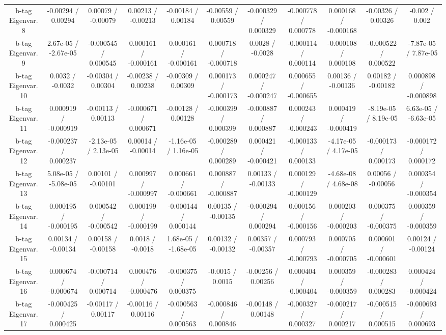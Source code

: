 \begin{table}[htbp]
\begin{center}
\begin{tabular}{|c|c|c|c|c|c|c|c|c|c|c|}
  b-tag Eigenvar. 8 & -0.00294 / 0.00294 & 0.00079 / -0.00079 & 0.00213 / -0.00213 & -0.00184 / 0.00184 & -0.00559 / 0.00559 & -0.000329 / 0.000329 & -0.000778 / 0.000778 & 0.000168 / -0.000168 & -0.00326 / 0.00326 & -0.002 / 0.002 \\ 
  b-tag Eigenvar. 9 & 2.67e-05 / -2.67e-05 & -0.000545 / 0.000545 & 0.000161 / -0.000161 & 0.000161 / -0.000161 & 0.000718 / -0.000718 & 0.0028 / -0.0028 & -0.000114 / 0.000114 & -0.000108 / 0.000108 & -0.000522 / 0.000522 & -7.87e-05 / 7.87e-05 \\ 
  b-tag Eigenvar. 10 & 0.0032 / -0.0032 & -0.00304 / 0.00304 & -0.00238 / 0.00238 & -0.00309 / 0.00309 & 0.000173 / -0.000173 & 0.000247 / -0.000247 & 0.000655 / -0.000655 & 0.00136 / -0.00136 & 0.00182 / -0.00182 & 0.000898 / -0.000898 \\ 
  b-tag Eigenvar. 11 & 0.000919 / -0.000919 & -0.00113 / 0.00113 & -0.000671 / 0.000671 & -0.00128 / 0.00128 & -0.000399 / 0.000399 & -0.000887 / 0.000887 & 0.000243 / -0.000243 & 0.000419 / -0.000419 & -8.19e-05 / 8.19e-05 & 6.63e-05 / -6.63e-05 \\ 
  b-tag Eigenvar. 12 & -0.000237 / 0.000237 & -2.13e-05 / 2.13e-05 & 0.00014 / -0.00014 & -1.16e-05 / 1.16e-05 & -0.000289 / 0.000289 & 0.000421 / -0.000421 & -0.000133 / 0.000133 & -4.17e-05 / 4.17e-05 & -0.000173 / 0.000173 & -0.000172 / 0.000172 \\ 
  b-tag Eigenvar. 13 & 5.08e-05 / -5.08e-05 & 0.00101 / -0.00101 & 0.000997 / -0.000997 & 0.000661 / -0.000661 & 0.000887 / -0.000887 & 0.00133 / -0.00133 & 0.000129 / -0.000129 & -4.68e-08 / 4.68e-08 & 0.00056 / -0.00056 & 0.000354 / -0.000354 \\ 
  b-tag Eigenvar. 14 & 0.000195 / -0.000195 & 0.000542 / -0.000542 & 0.000199 / -0.000199 & -0.000144 / 0.000144 & 0.00135 / -0.00135 & -0.000294 / 0.000294 & 0.000156 / -0.000156 & 0.000203 / -0.000203 & 0.000375 / -0.000375 & 0.000359 / -0.000359 \\ 
  b-tag Eigenvar. 15 & 0.00134 / -0.00134 & 0.00158 / -0.00158 & 0.0018 / -0.0018 & 1.68e-05 / -1.68e-05 & 0.00132 / -0.00132 & 0.00357 / -0.00357 & 0.000793 / -0.000793 & 0.000705 / -0.000705 & 0.000601 / -0.000601 & 0.00124 / -0.00124 \\ 
  b-tag Eigenvar. 16 & 0.000674 / -0.000674 & -0.000714 / 0.000714 & 0.000476 / -0.000476 & -0.000375 / 0.000375 & -0.0015 / 0.0015 & -0.00256 / 0.00256 & 0.000404 / -0.000404 & 0.000359 / -0.000359 & -0.000283 / 0.000283 & 0.000424 / -0.000424 \\ 
  b-tag Eigenvar. 17 & -0.000425 / 0.000425 & -0.00117 / 0.00117 & -0.00116 / 0.00116 & -0.000563 / 0.000563 & -0.000846 / 0.000846 & -0.00148 / 0.00148 & -0.000327 / 0.000327 & -0.000217 / 0.000217 & -0.000515 / 0.000515 & -0.000693 / 0.000693 \\ 

\end{tabular}
\end{center}
\end{table}
